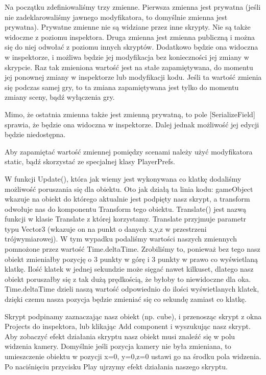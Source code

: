 \documentclass[brudnopis]{xmgr}
\begin{document}
Na początku zdefiniowaliśmy trzy zmienne. Pierwsza zmienna jest prywatna (jeśli nie zadeklarowaliśmy jawnego modyfikatora, to domyślnie zmienna jest prywatna). Prywatne zmienne nie są widziane przez inne skrypty. Nie są także widoczne z poziomu inspektora. Druga zmienna jest zmienna publiczną i można się do niej odwołać z poziomu innych skryptów. Dodatkowo będzie ona widoczna w inspektorze, i możliwa będzie jej modyfikacja bez konieczności jej zmiany w skrypcie. Raz tak zmieniona wartość jest na stałe zapamiętywana, do momentu jej ponownej zmiany w inspektorze lub modyfikacji kodu. Jeśli ta wartość zmienia się podczas samej gry, to ta zmiana zapamiętywana jest tylko do momentu zmiany sceny, bądź wyłączenia gry.

Mimo, że ostatnia zmienna także jest zmienną prywatną, to pole [SerializeField] sprawia, że będzie ona widoczna w inspektorze. Dalej jednak możliwość jej edycji będzie niedostępna.

Aby zapamiętać wartość zmiennej pomiędzy scenami należy użyć modyfikatora static, bądź skorzystać ze specjalnej klasy PlayerPrefs.

W funkcji Update(), która jak wiemy jest wykonywana co klatkę dodaliśmy możliwość poruszania się dla obiektu. Oto jak działą ta linia kodu: gameObject wkazuje na obiekt do którego aktualnie jest podpięty nasz skrypt, a transform odwołuje nas do komponentu Transform tego obiektu. Translate() jest nazwą funkcji w klasie Translate z której korzystamy. Translate przyjmuje parametr typu Vector3 (wkazuje on na punkt o danych x,y,z w przestrzeni trójwymiarowej). W tym wypadku podaliśmy wartości naszych zmiennych pomnożone przez wartość Time.deltaTime. Zrobiliśmy to, ponieważ bez tego nasz obiekt zmieniałby pozycję o 3 punkty w górę i 3 punkty w prawo co wyświetlaną klatkę. Ilość klatek w jednej sekundzie może sięgać nawet kilkuset, dlatego nasz obiekt poruszałby się z tak dużą prędkością, że byłoby to niewidoczne dla oka. Time.deltaTime dzieli naszą wartość odpowiednio do ilości wyświetlanych  klatek, dzięki czemu nasza pozycja będzie zmieniać się co sekundę zamiast co klatkę.

Skrypt podpinamy zaznaczając nasz obiekt (np. cube), i przenosząc skrypt z okna Projects do inspektora, lub klikając Add component i wyszukując nasz skrypt. Aby zobaczyć efekt działania skryptu nasz obiekt musi znaleźć się w polu widzenia kamery. Domyślnie jeśli pozycja kamery nie była zmieniana, to umieszczenie obiektu w pozycji x=0, y=0,z=0 ustawi go na środku pola widzenia. Po naciśnięciu przycisku Play ujrzymy efekt działania naszego skryptu.
\end{document}
